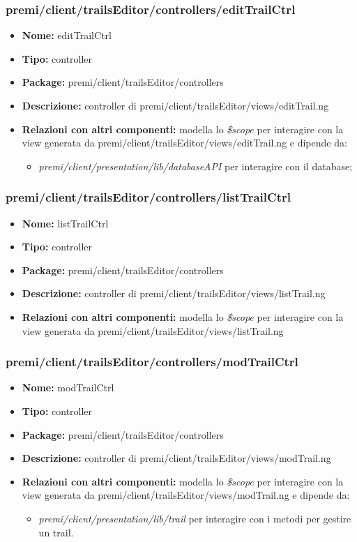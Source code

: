\subsubsection{premi/client/trailsEditor/controllers/editTrailCtrl}
\begin{itemize}
  \item[] \textbf{Nome:} editTrailCtrl
  \item[] \textbf{Tipo:} controller
  \item[] \textbf{Package:} premi/client/trailsEditor/controllers
  \item[] \textbf{Descrizione:} controller di premi/client/trailsEditor/views/editTrail.ng
  \item[] \textbf{Relazioni con altri componenti:} modella lo \textit{\$scope} per interagire con la view generata da premi/client/trailsEditor/views/editTrail.ng e dipende da:   
  \begin{itemize}
  \item[] \textit{premi/client/presentation/lib/databaseAPI} per interagire con il database;    
  \end{itemize}
\end{itemize}
\subsubsection{premi/client/trailsEditor/controllers/listTrailCtrl}
\begin{itemize}
  \item[] \textbf{Nome:} listTrailCtrl
  \item[] \textbf{Tipo:} controller
  \item[] \textbf{Package:} premi/client/trailsEditor/controllers
  \item[] \textbf{Descrizione:} controller di premi/client/trailsEditor/views/listTrail.ng
  \item[] \textbf{Relazioni con altri componenti:} modella lo \textit{\$scope} per interagire con la view generata da premi/client/trailsEditor/views/listTrail.ng
\end{itemize}
\subsubsection{premi/client/trailsEditor/controllers/modTrailCtrl}
\begin{itemize}
  \item[] \textbf{Nome:} modTrailCtrl
  \item[] \textbf{Tipo:} controller
  \item[] \textbf{Package:} premi/client/trailsEditor/controllers
  \item[] \textbf{Descrizione:} controller di premi/client/trailsEditor/views/modTrail.ng
  \item[] \textbf{Relazioni con altri componenti:} modella lo \textit{\$scope} per interagire con la view generata da premi/client/trailsEditor/views/modTrail.ng e dipende da:
  \begin{itemize}
  	\item \textit{premi/client/presentation/lib/trail} per interagire con i metodi per gestire un trail.
  \end{itemize}
\end{itemize}
